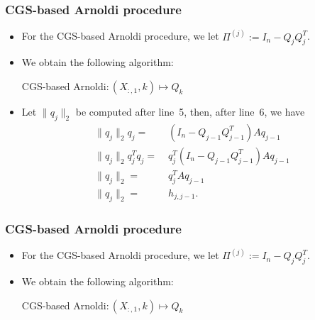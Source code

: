 \documentclass[t,usepdftitle=false]{beamer}
\begin{document}
\begin{frame}
\frametitle{CGS-based Arnoldi procedure}	
\begin{itemize}
\item For the CGS-based Arnoldi procedure, we let $\Pi^{(j)}:=I_n-Q_jQ_j^T$.
\item We obtain the following algorithm:
\begin{algorithm}[H]
\small
\caption{CGS-based Arnoldi$:(X_{:,1},k)\mapsto Q_k$}
\begin{algorithmic}[1]
\ENDFOR
\end{algorithmic}
\end{algorithm}		
\vspace{-.4cm}
\item Let $\|q_j\|_2$ be computed after line~5, then, after line~6, we have
\begin{align*}
\|q_j\|_2q_j=&\;(I_n-Q_{j-1}Q_{j-1}^T)Aq_{j-1}\\
\|q_j\|_2q_j^Tq_j=&\;q_j^T(I_n-Q_{j-1}Q_{j-1}^T)Aq_{j-1}\\
\|q_j\|_2=&\;q_j^TAq_{j-1}\\
\|q_j\|_2=&\;h_{j,j-1}.
\end{align*}
\end{itemize}
\end{frame}   

\addtocounter{framenumber}{-1}
\begin{frame}
\frametitle{CGS-based Arnoldi procedure}	
\begin{itemize}
\item For the CGS-based Arnoldi procedure, we let $\Pi^{(j)}:=I_n-Q_jQ_j^T$.
\item We obtain the following algorithm:
\begin{algorithm}[H]
\small
\caption{CGS-based Arnoldi$:(X_{:,1},k)\mapsto Q_k$}
\begin{algorithmic}[1]
\ENDFOR
\end{algorithmic}
\end{algorithm}		
\end{itemize}
\end{frame}   
\end{document}
